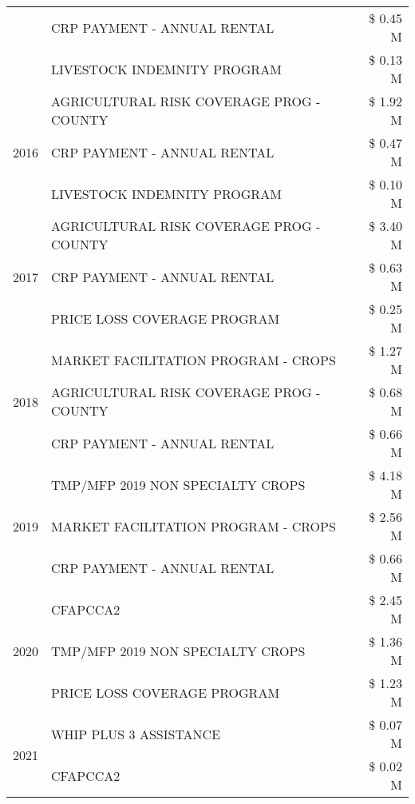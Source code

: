 \begin{tabular}{llr}
 & CRP PAYMENT - ANNUAL RENTAL & \$ 0.45 M \\
 & LIVESTOCK INDEMNITY PROGRAM & \$ 0.13 M \\
\cline{1-3}
\multirow[t]{3}{*}{2016} & AGRICULTURAL RISK COVERAGE PROG - COUNTY & \$ 1.92 M \\
 & CRP PAYMENT - ANNUAL RENTAL & \$ 0.47 M \\
 & LIVESTOCK INDEMNITY PROGRAM & \$ 0.10 M \\
\cline{1-3}
\multirow[t]{3}{*}{2017} & AGRICULTURAL RISK COVERAGE PROG - COUNTY & \$ 3.40 M \\
 & CRP PAYMENT - ANNUAL RENTAL & \$ 0.63 M \\
 & PRICE LOSS COVERAGE PROGRAM & \$ 0.25 M \\
\cline{1-3}
\multirow[t]{3}{*}{2018} & MARKET FACILITATION PROGRAM - CROPS & \$ 1.27 M \\
 & AGRICULTURAL RISK COVERAGE PROG - COUNTY & \$ 0.68 M \\
 & CRP PAYMENT - ANNUAL RENTAL & \$ 0.66 M \\
\cline{1-3}
\multirow[t]{3}{*}{2019} & TMP/MFP 2019 NON SPECIALTY CROPS & \$ 4.18 M \\
 & MARKET FACILITATION PROGRAM - CROPS & \$ 2.56 M \\
 & CRP PAYMENT - ANNUAL RENTAL & \$ 0.66 M \\
\cline{1-3}
\multirow[t]{3}{*}{2020} & CFAPCCA2 & \$ 2.45 M \\
 & TMP/MFP 2019 NON SPECIALTY CROPS & \$ 1.36 M \\
 & PRICE LOSS COVERAGE PROGRAM & \$ 1.23 M \\
\cline{1-3}
\multirow[t]{2}{*}{2021} & WHIP PLUS 3 ASSISTANCE & \$ 0.07 M \\
 & CFAPCCA2 & \$ 0.02 M \\
\cline{1-3}
\bottomrule
\end{tabular}
